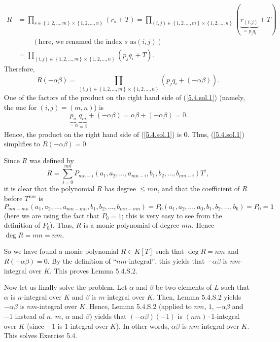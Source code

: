 \documentclass[numbers=enddot,12pt,final,onecolumn,notitlepage]{scrartcl}%
\begin{document}
\begin{align*}
R  &  =\prod\limits_{s\in\left\{  1,2,...,m\right\}  \times\left\{
1,2,...,n\right\}  }\left(  r_{s}+T\right)  =\prod\limits_{\left(  i,j\right)
\in\left\{  1,2,...,m\right\}  \times\left\{  1,2,...,n\right\}  }\left(
\underbrace{r_{\left(  i,j\right)  }}_{=p_{j}q_{i}}+T\right) \\
&  \ \ \ \ \ \ \ \ \ \ \left(  \text{here, we renamed the index }s\text{ as
}\left(  i,j\right)  \right) \\
&  =\prod\limits_{\left(  i,j\right)  \in\left\{  1,2,...,m\right\}
\times\left\{  1,2,...,n\right\}  }\left(  p_{j}q_{i}+T\right)  .
\end{align*}
Therefore,%
\begin{equation}
R\left(  -\alpha\beta\right)  =\prod\limits_{\left(  i,j\right)  \in\left\{
1,2,...,m\right\}  \times\left\{  1,2,...,n\right\}  }\left(  p_{j}%
q_{i}+\left(  -\alpha\beta\right)  \right)  . \label{5.4.sol.1}%
\end{equation}
One of the factors of the product on the right hand side of (\ref{5.4.sol.1})
(namely, the one for $\left(  i,j\right)  =\left(  m,n\right)  $) is%
\[
\underbrace{p_{n}}_{=\alpha}\underbrace{q_{m}}_{=\beta}+\left(  -\alpha
\beta\right)  =\alpha\beta+\left(  -\alpha\beta\right)  =0.
\]
Hence, the product on the right hand side of (\ref{5.4.sol.1}) is $0$. Thus,
(\ref{5.4.sol.1}) simplifies to $R\left(  -\alpha\beta\right)  =0$.

Since $R$ was defined by
\[
R=\sum\limits_{i=0}^{mn}P_{mn-i}\left(  a_{1},a_{2},...,a_{mn-i},b_{1}%
,b_{2},...,b_{mn-i}\right)  T^{i},
\]
it is clear that the polynomial $R$ has degree $\leq mn$, and that the
coefficient of $R$ before $T^{mn}$ is%
\[
P_{mn-mn}\left(  a_{1},a_{2},...,a_{mn-mn},b_{1},b_{2},...,b_{mn-mn}\right)
=P_{0}\left(  a_{1},a_{2},...,a_{0},b_{1},b_{2},...,b_{0}\right)  =P_{0}=1
\]
(here we are using the fact that $P_{0}=1$; this is very easy to see from the
definition of $P_{0}$). Thus, $R$ is a monic polynomial of degree $mn$. Hence
$\deg R=mn=nm$.

So we have found a monic polynomial $R\in K\left[  T\right]  $ such that $\deg
R=nm$ and $R\left(  -\alpha\beta\right)  =0$. By the definition of
``$nm$-integral'', this yields that $-\alpha\beta$ is $nm$-integral over $K$.
This proves Lemma 5.4.S.2.

Now let us finally solve the problem. Let $\alpha$ and $\beta$ be two elements
of $L$ such that $\alpha$ is $n$-integral over $K$ and $\beta$ is $m$-integral
over $K$. Then, Lemma 5.4.S.2 yields $-\alpha\beta$ is $nm$-integral over $K$.
Hence, Lemma 5.4.S.2 (applied to $nm$, $1$, $-\alpha\beta$ and $-1$ instead of
$n$, $m$, $\alpha$ and $\beta$) yields that $\left(  -\alpha\beta\right)
\left(  -1\right)  $ is $\left(  nm\right)  \cdot1$-integral over $K$ (since
$-1$ is $1$-integral over $K$). In other words, $\alpha\beta$ is $nm$-integral
over $K$. This solves Exercise 5.4.
\end{document}
